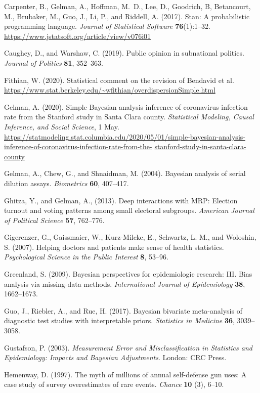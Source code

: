 \documentclass[11pt]{article}
\begin{document}
\bibitem Carpenter, B., Gelman, A., Hoffman, M.~D., Lee, D., Goodrich, B, Betancourt, M., Brubaker, M., Guo, J.,  Li, P., and Riddell, A.  (2017). Stan: A probabilistic programming language. {\em Journal of Statistical Software} {\bf 76}(1):1--32. {\small \url{https://www.jstatsoft.org/article/view/v076i01}}

\bibitem Caughey, D., and Warshaw, C. (2019).  Public opinion in subnational politics.  {\em Journal of Politics} {\bf 81}, 352--363.

\bibitem Fithian, W. (2020).  Statistical comment on the revision of Bendavid et al. {\small \url{https://www.stat.berkeley.edu/~wfithian/overdispersionSimple.html}}

\bibitem Gelman, A. (2020).  Simple Bayesian analysis inference of coronavirus infection rate from the Stanford study in Santa Clara county. {\em Statistical Modeling, Causal Inference, and Social Science}, 1 May.  {\small \url{https://statmodeling.stat.columbia.edu/2020/05/01/simple-bayesian-analysis-inference-of-coronavirus-infection-rate-from-the-}} {\small \url{stanford-study-in-santa-clara-county}}

\bibitem Gelman, A., Chew, G., and Shnaidman, M. (2004).  Bayesian analysis of serial dilution assays. {\em Biometrics} {\bf 60}, 407--417.

\bibitem Ghitza, Y., and Gelman, A., (2013). Deep interactions with MRP: Election turnout and voting patterns among small electoral subgroups. {\em American Journal of Political Science} {\bf 57}, 762--776.

\bibitem Gigerenzer, G., Gaissmaier, W., Kurz-Milcke, E., Schwartz, L. M., and Woloshin, S.  (2007).  Helping doctors and patients make sense of health statistics.  {\em Psychological Science in the Public Interest} {\bf 8}, 53--96.

\bibitem Greenland, S. (2009).  Bayesian perspectives for epidemiologic research: III. Bias analysis via missing-data methods.  {\em International Journal of Epidemiology} {\bf 38}, 1662--1673.

\bibitem Guo, J., Riebler, A., and Rue, H. (2017).  Bayesian bivariate meta-analysis of diagnostic test studies with interpretable priors.  {\em Statistics in Medicine} {\bf 36}, 3039--3058.

\bibitem Gustafson, P. (2003).  {\em Measurement Error and Misclassification in Statistics and Epidemiology: Impacts and Bayesian Adjustments}.  London:  CRC Press.

\bibitem Hemenway, D. (1997).  The myth of millions of annual self-defense gun uses:  A case study of survey overestimates of rare events.  {\em Chance} {\bf 10} (3), 6--10.
\end{document}
